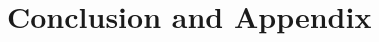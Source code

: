\documentclass[11pt, a4paper]{book}
\begin{document}
\part{Conclusion and Appendix}




%
%
%


\backmatter




\printindex
\end{document}

